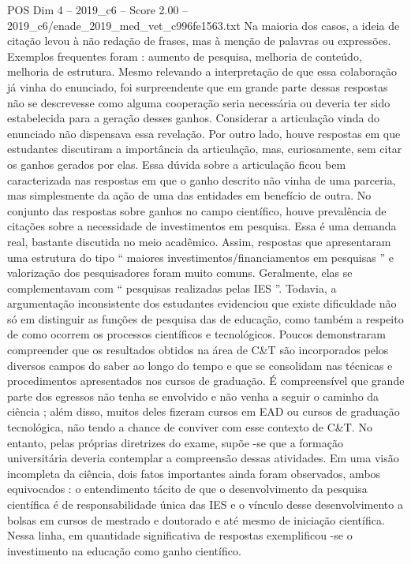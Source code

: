 \begin{textsample}{POS Dim 4 – 2019\_c6 – Score 2.00 – 2019\_c6/enade\_2019\_med\_vet\_c996fe1563.txt}
Na maioria dos casos, a ideia de citação levou à não redação de frases, mas à menção de palavras ou expressões.
Exemplos frequentes foram : aumento de pesquisa, melhoria de conteúdo, melhoria de estrutura.
Mesmo relevando a interpretação de que essa colaboração já vinha do enunciado, foi surpreendente que em grande parte dessas respostas não se descrevesse como alguma cooperação seria necessária ou deveria ter sido estabelecida para a geração desses ganhos.
Considerar a articulação vinda do enunciado não dispensava essa revelação.
Por outro lado, houve respostas em que estudantes discutiram a importância da articulação, mas, curiosamente, sem citar os ganhos gerados por elas.
Essa dúvida sobre a articulação ficou bem caracterizada nas respostas em que o ganho descrito não vinha de uma parceria, mas simplesmente da ação de uma das entidades em benefício de outra.
No conjunto das respostas sobre ganhos no campo científico, houve prevalência de citações sobre a necessidade de investimentos em pesquisa.
Essa é uma demanda real, bastante discutida no meio acadêmico.
Assim, respostas que apresentaram uma estrutura do tipo “ maiores investimentos/financiamentos em pesquisas ” e valorização dos pesquisadores foram muito comuns.
Geralmente, elas se complementavam com “ pesquisas realizadas pelas IES ”.
Todavia, a argumentação inconsistente dos estudantes evidenciou que existe dificuldade não só em distinguir as funções de pesquisa das de educação, como também a respeito de como ocorrem os processos científicos e tecnológicos.
Poucos demonstraram compreender que os resultados obtidos na área de C\&T são incorporados pelos diversos campos do saber ao longo do tempo e que se consolidam nas técnicas e procedimentos apresentados nos cursos de graduação.
É compreensível que grande parte dos egressos não tenha se envolvido e não venha a seguir o caminho da ciência ; além disso, muitos deles fizeram cursos em EAD ou cursos de graduação tecnológica, não tendo a chance de conviver com esse contexto de C\&T.
No entanto, pelas próprias diretrizes do exame, supõe -se que a formação universitária deveria contemplar a compreensão dessas atividades.
Em uma visão incompleta da ciência, dois fatos importantes ainda foram observados, ambos equivocados : o entendimento tácito de que o desenvolvimento da pesquisa científica é de responsabilidade única das IES e o vínculo desse desenvolvimento a bolsas em cursos de mestrado e doutorado e até mesmo de iniciação científica.
Nessa linha, em quantidade significativa de respostas exemplificou -se o investimento na educação como ganho científico.

\end{textsample}
